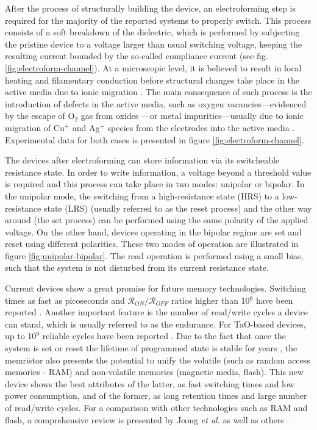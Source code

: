 After the process of structurally building the device, an electroforming step is required for the majority of the reported systems to properly switch. This process consists of a soft breakdown of the dielectric, which is performed by subjecting the pristine device to a voltage larger than usual switching voltage, keeping the resulting current bounded by the so-called compliance current (see fig. \ref{fig:electroform-channel}). At a microscopic level, it is believed to result in local heating and filamentary conduction before structural changes take place in the active media due to ionic migration \cite{Sharma2014,Yalon2012}. The main consequence of such process is the introduction of defects in the active media, such as oxygen vacancies---evidenced by the escape of O$_2$ gas from oxides \cite{Kwon2010,Jeong2012,Chen2013,Miao2011a}---or metal impurities---usually due to ionic migration of Cu$^+$ and Ag$^+$ species from the electrodes into the active media \cite{Yang2012,Yang2014,Guo2007}. Experimental data for both cases is presented in figure \ref{fig:electroform-channel}.

The devices after electroforming can store information via its switcheable resistance state. In order to write information, a voltage beyond a threshold value is required and this process can take place in two modes: unipolar or bipolar. In the unipolar mode, the switching from a high-resistance state (HRS) to a low-resistance state (LRS) (usually referred to as the reset process) and the other way around (the set process) can be performed using the same polarity of the applied voltage. On the other hand, devices operating in the bipolar regime are set and reset using different polarities. These two modes of operation are illustrated in figure \ref{fig:unipolar-bipolar}. The read operation is performed using a small bias, such that the system is not disturbed from its current resistance state.

Current devices show a great promise for future memory technologies. Switching times as fast as picoseconds and $\mathcal{R}_{ON}/\mathcal{R}_{OFF}$ ratios higher than 10$^9$ have been reported \cite{Pan2014}. Another important feature is the number of read/write cycles a device can stand, which is usually referred to as the endurance. For TaO-based devices, up to 10$^9$ reliable cycles have been reported \cite{Yang2010}. Due to the fact that once the system is set or reset the lifetime of programmed state is stable for years \cite{Lee2011,Waser2007}, the memristor also presents the potential to unify the volatile (such as random access memories - RAM) and non-volatile memories (magnetic media, flash). This new device shows the best attributes of the latter, as fast switching times and low power consumption, and of the former, as long retention times and large number of read/write cycles. For a comparison with other technologies such as RAM and flash, a comprehensive review is presented by Jeong {\em et al.} \cite{Jeong2012} as well as others \cite{Fujisaki2010, Chua2011, Kim2011, Waser2007, Waser2009, Yang2012, Szot2011, Pan2014}.

